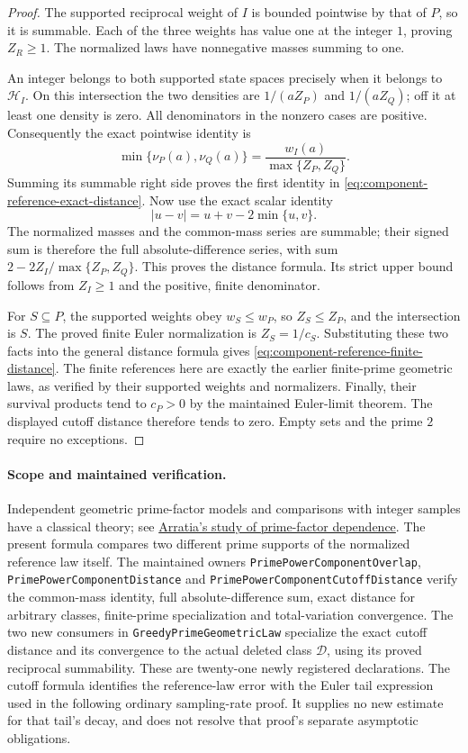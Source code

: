 \documentclass[11pt]{article}
\theoremstyle{definition}
\begin{document}
\begin{proof}
The supported reciprocal weight of \(I\) is bounded pointwise by
that of \(P\), so it is summable. Each of the three weights has
value one at the integer \(1\), proving \(Z_R\ge1\).
The normalized laws have nonnegative masses summing to one.

An integer belongs to both supported state spaces precisely when
it belongs to \(\mathcal H_I\). On this intersection the two
densities are \(1/(aZ_P)\) and \(1/(aZ_Q)\); off it at least one
density is zero. All denominators in the nonzero cases are positive.
Consequently the exact pointwise identity is
\[
 \min\{\nu_P(a),\nu_Q(a)\}
       =\frac{w_I(a)}{\max\{Z_P,Z_Q\}}.
\]
Summing its summable right side proves the first identity in
\eqref{eq:component-reference-exact-distance}. Now use the exact
scalar identity
\[
 |u-v|=u+v-2\min\{u,v\}.
\]
The normalized masses and the common-mass series are summable;
their signed sum is therefore the full absolute-difference series,
with sum \(2-2Z_I/\max\{Z_P,Z_Q\}\).
This proves the distance formula. Its strict upper bound follows
from \(Z_I\ge1\) and the positive, finite denominator.

For \(S\subseteq P\), the supported weights obey \(w_S\le w_P\),
so \(Z_S\le Z_P\), and the intersection is \(S\).
The proved finite Euler normalization is \(Z_S=1/c_S\).
Substituting these two facts into the general distance formula
gives \eqref{eq:component-reference-finite-distance}.
The finite references here are exactly the earlier finite-prime
geometric laws, as verified by their supported weights and normalizers.
Finally, their survival products tend to \(c_P>0\) by the maintained
Euler-limit theorem. The displayed cutoff distance therefore tends
to zero. Empty sets and the prime \(2\) require no exceptions.
\end{proof}

\paragraph{Scope and maintained verification.}
Independent geometric prime-factor models and comparisons with
integer samples have a classical theory; see
\href{https://arxiv.org/abs/1305.0941}
     {Arratia's study of prime-factor dependence}.
The present formula compares two different prime supports of the
normalized reference law itself.
The maintained owners \texttt{PrimePowerComponentOverlap},
\texttt{PrimePowerComponentDistance} and
\texttt{PrimePowerComponentCutoffDistance} verify the common-mass
identity, full absolute-difference sum, exact distance for arbitrary
classes, finite-prime specialization and total-variation convergence.
The two new consumers in \texttt{GreedyPrimeGeometricLaw} specialize
the exact cutoff distance and its convergence to the actual deleted
class \(\mathcal D\), using its proved reciprocal summability.
These are twenty-one newly registered declarations.
The cutoff formula identifies the reference-law error with the Euler
tail expression used in the following ordinary sampling-rate proof.
It supplies no new estimate for that tail's decay, and does not
resolve that proof's separate asymptotic obligations.
\end{document}
